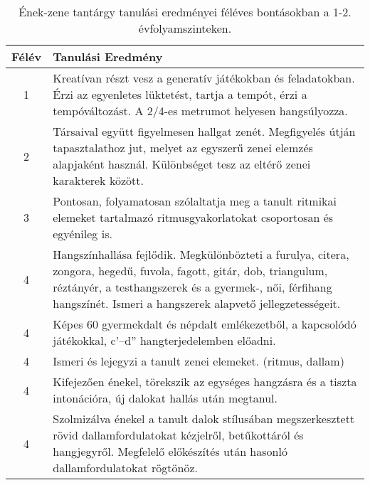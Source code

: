        
           \begin{longtable}{c | p{} }
            \caption[Ének-zene 1-2.]{Ének-zene tantárgy tanulási eredményei féléves bontásokban a 1-2. évfolyamszinteken. }  \\

            \textbf{Félév} & \textbf{Tanulási Eredmény} \\
            \hline
            \endhead
                                
                                          1 &  Kreatívan részt vesz a generatív játékokban és feladatokban. Érzi az egyenletes lüktetést, tartja a tempót, érzi a tempóváltozást. A 2/4-es metrumot helyesen hangsúlyozza. \\ \hline
                                          2 &  Társaival együtt figyelmesen hallgat zenét. Megfigyelés útján tapasztalathoz jut, melyet az egyszerű zenei elemzés alapjaként használ. Különbséget tesz az eltérő zenei karakterek között. \\ \hline
                                      
                                
                                          3 &  Pontosan, folyamatosan szólaltatja meg a tanult ritmikai elemeket tartalmazó ritmusgyakorlatokat csoportosan és egyénileg is. \\ \hline
                                      
                                
                                          4 &  Hangszínhallása fejlődik. Megkülönbözteti a furulya, citera, zongora, hegedű, fuvola, fagott, gitár, dob, triangulum, réztányér, a testhangszerek és a gyermek-, női, férfihang hangszínét. Ismeri a hangszerek alapvető jellegzetességeit. \\ \hline
                                          4 &  Képes 60 gyermekdalt és népdalt emlékezetből, a kapcsolódó játékokkal, c’–d” hangterjedelemben előadni. \\ \hline
                                          4 &  Ismeri és lejegyzi a tanult zenei elemeket. (ritmus, dallam) \\ \hline
                                          4 &  Kifejezően énekel, törekszik az egységes hangzásra és a tiszta intonációra, új dalokat hallás után megtanul. \\ \hline
                                          4 &  Szolmizálva énekel a tanult dalok stílusában megszerkesztett rövid dallamfordulatokat kézjelről, betűkottáról és hangjegyről. Megfelelő előkészítés után hasonló dallamfordulatokat rögtönöz. \\ \hline
                                      
                        \end{longtable}
            \clearpage

